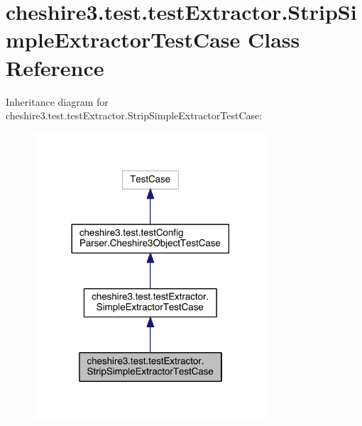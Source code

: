 \hypertarget{classcheshire3_1_1test_1_1test_extractor_1_1_strip_simple_extractor_test_case}{\section{cheshire3.\-test.\-test\-Extractor.\-Strip\-Simple\-Extractor\-Test\-Case Class Reference}
\label{classcheshire3_1_1test_1_1test_extractor_1_1_strip_simple_extractor_test_case}
}


Inheritance diagram for cheshire3.\-test.\-test\-Extractor.\-Strip\-Simple\-Extractor\-Test\-Case\-:
\nopagebreak
\begin{figure}[H]
\begin{center}
\leavevmode
\includegraphics[width=246pt]{classcheshire3_1_1test_1_1test_extractor_1_1_strip_simple_extractor_test_case__inherit__graph}
\end{center}
\end{figure}


